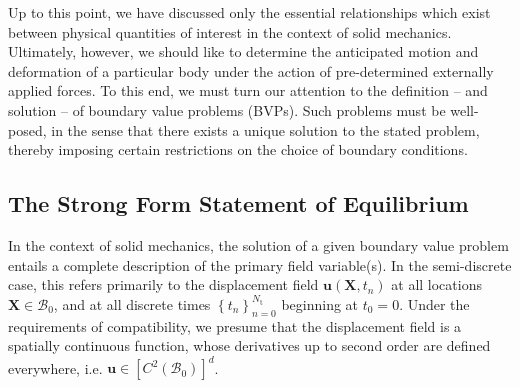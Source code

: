 Up to this point, we have discussed only the essential relationships which exist between physical quantities of interest in the context of solid mechanics. Ultimately, however, we should like to determine the anticipated motion and deformation of a particular body under the action of pre-determined externally applied forces. To this end, we must turn our attention to the definition -- and solution -- of boundary value problems (BVPs). Such problems must be well-posed, in the sense that there exists a unique solution to the stated problem, thereby imposing certain restrictions on the choice of boundary conditions.

\subsection*{The Strong Form Statement of Equilibrium} \label{sec:strongform}

In the context of solid mechanics, the solution of a given boundary value problem entails a complete description of the primary field variable(s). In the semi-discrete case, this refers primarily to the displacement field $\bm{u} (\bm{X},t_n)$ at all locations $\bm{X} \in \mathcal{B}_0$, and at all discrete times $\left\{ t_n \right\}_{n=0}^{N_{\mathrm t}}$ beginning at $t_0 = 0$. Under the requirements of compatibility, we presume that the displacement field is a spatially continuous function, whose derivatives up to second order are defined everywhere, i.e. $\bm{u} \in \left[ C^2 (\mathcal{B}_0) \right]^d$.

